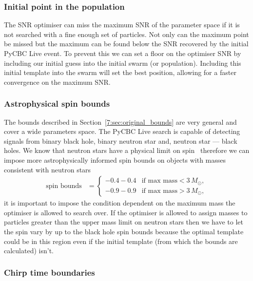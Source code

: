\subsubsection{Initial point in the population}

The SNR optimiser can miss the maximum SNR of the parameter space if it is not searched with a fine enough set of particles. Not only can the maximum point be missed but the maximum can be found below the SNR recovered by the initial PyCBC Live event. To prevent this we can set a floor on the optimiser SNR by including our initial guess into the initial swarm (or population). Including this initial template into the swarm will set the best position, allowing for a faster convergence on the maximum SNR.

\subsubsection{Astrophysical spin bounds}

The bounds described in Section~\ref{7:sec:original_bounds} are very general and cover a wide parameters space. The PyCBC Live search is capable of detecting \gwadj signals from binary black hole, binary neutron star and, neutron star — black holes. We know that neutron stars have a physical limit on spin~\cite{Harry_Lundgren:2012} therefore we can impose more astrophysically informed spin bounds on objects with masses consistent with neutron stars
%
\begin{align}
    \text{spin bounds} &= 
    \begin{cases} 
        -0.4 - 0.4 & \text{if } \text{max mass} < 3 \, M_{\odot}, \\
        -0.9 - 0.9 & \text{if } \text{max mass} > 3 \, M_{\odot},
    \end{cases} 
\end{align}
%
it is important to impose the condition dependent on the maximum mass the optimiser is allowed to search over. If the optimiser is allowed to assign masses to particles greater than the upper mass limit on neutron stars then we have to let the spin vary by up to the black hole spin bounds because the optimal template could be in this region even if the initial template (from which the bounds are calculated) isn't.

\subsubsection{Chirp time boundaries}

